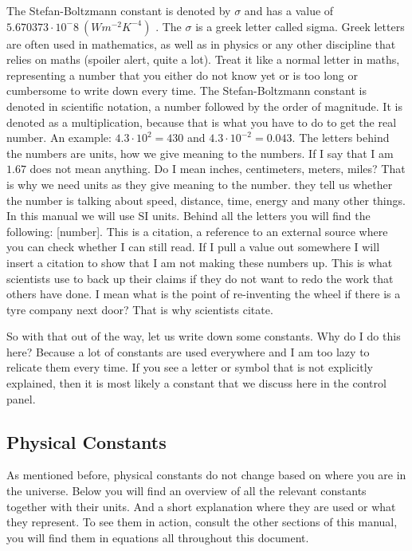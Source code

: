 The Stefan-Boltzmann constant is denoted by $\sigma$ and has a value of $5.670373 \cdot 10^-8 \ (Wm^{-2}K^{-4})$ \cite{stefan-boltzmann}. The $\sigma$ is a greek letter called sigma. Greek 
letters are often used in mathematics, as well as in physics or any other discipline that relies on maths (spoiler alert, quite a lot). Treat it like a normal letter in maths, representing a 
number that you either do not know yet or is too long or cumbersome to write down every time. The Stefan-Boltzmann constant is denoted in scientific notation, a number followed by the order of 
magnitude. It is denoted as a multiplication, because that is what you have to do to get the real number. An example: $4.3 \cdot 10^2 = 430$ and $4.3 \cdot 10^{-2} = 0.043$. The
letters behind the numbers are units, how we give meaning to the numbers. If I say that I am $1.67$ does not mean anything. Do I mean inches, centimeters, meters, miles? That is why we need units
as they give meaning to the number. they tell us whether the number is talking about speed, distance, time, energy and many other things. In this manual we will use SI units. Behind all the
letters you will find the following: [number]. This is a citation, a reference to an external source where you can check whether I can still read. If I pull a value out somewhere I will insert a 
citation to show that I am not making these numbers up. This is what scientists use to back up their claims if they do not want to redo the work that others have done. I mean what is the point 
of re-inventing the wheel if there is a tyre company next door? That is why scientists citate.

So with that out of the way, let us write down some constants. Why do I do this here? Because a lot of constants are used everywhere and I am too lazy to relicate them every time. If you see a 
letter or symbol that is not explicitly explained, then it is most likely a constant that we discuss here in the control panel. 

\subsection{Physical Constants}
As mentioned before, physical constants do not change based on where you are in the universe. Below you will find an overview of all the relevant constants together with their units. And a short
explanation where they are used or what they represent. To see them in action, consult the other sections of this manual, you will find them in equations all throughout this document.

